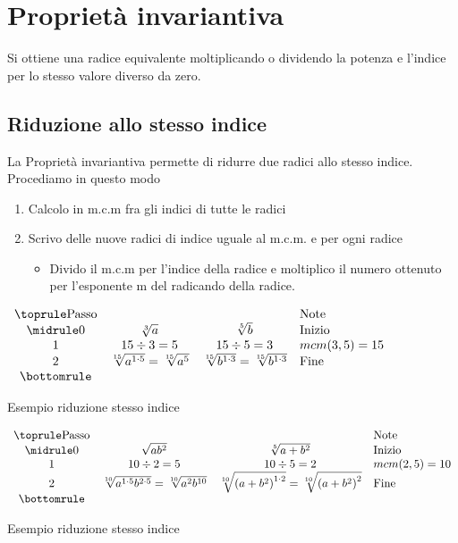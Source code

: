 \section{Proprietà invariantiva}
\label{Sec:Propinvariantivaradicali}
\begin{definizionet}
Si ottiene una radice equivalente moltiplicando o dividendo la potenza e l'indice per lo stesso valore diverso da zero.
\end{definizionet}
\subsection{Riduzione allo stesso indice}
\label{sec:RiduzioneAlloStessoIndice}

La Proprietà invariantiva permette di ridurre due radici allo stesso indice. Procediamo in questo modo
\begin{enumerate}
	\item Calcolo in m.c.m fra gli indici di tutte le radici
	\item Scrivo delle nuove radici di indice uguale al m.c.m. e per ogni radice
	\begin{itemize}
	\item Divido il m.c.m per l'indice  della radice e moltiplico il numero ottenuto per l'esponente m del radicando della  radice.
	\end{itemize}
\end{enumerate}

\begin{table}[H]
\centering
$
\begin{array}{cccl}
\toprule
\text{Passo} &  &  & \text{Note} \\  
\midrule
0 & \sqrt[3]{a} &\sqrt[5]{b}  &\text{Inizio} \\ 
1 & 15\div 3=5 &15\div 5=3  & mcm(3,5)=15 \\  
2 &\sqrt[15]{a^{1\cdot5}}=\sqrt[15]{a^{5}}  &\sqrt[15]{b^{1\cdot3}}=\sqrt[15]{b^{1\cdot3}}  &\text{Fine} \\
\bottomrule	
\end{array} 
$
\label{tab:Es1Ridstessoindice}
\caption{Esempio riduzione stesso indice}
\end{table}
\begin{table}[H]
\centering
$
\begin{array}{cccl}
\toprule
\text{Passo} &  &  &\text{Note} \\  
\midrule
0 & \sqrt{ab^2} &\sqrt[5]{a+b^2}  &\text{Inizio} \\ 
1 & 10\div 2=5 &10\div 5=2  & mcm(2,5)=10 \\  
2 &\sqrt[10]{a^{1\cdot 5}b^{2\cdot 5}}=\sqrt[10]{a^{2}b^{10}}& \sqrt[10]{\left( a+b^2\right)^{1\cdot 2} }=\sqrt[10]{\left( a+b^2\right)^{2} }   &\text{Fine} \\
\bottomrule	
\end{array} 
$
\label{tab:Es1Ridstessoindice2}
\caption{Esempio riduzione stesso indice}
\end{table}
